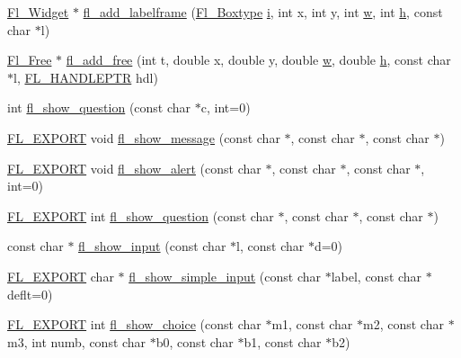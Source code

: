\begin{DoxyCompactItemize}
\item 
\hyperlink{class_fl___widget}{Fl\+\_\+\+Widget} $\ast$ \hyperlink{forms_8_h_ac556ad3943d9136f6abe849b50a025bf}{fl\+\_\+add\+\_\+labelframe} (\hyperlink{_enumerations_8_h_ae48bf9070f8541de17829f54ccacc6bc}{Fl\+\_\+\+Boxtype} \hyperlink{forms_8_h_acb559820d9ca11295b4500f179ef6392}{i}, int x, int y, int \hyperlink{forms_8_h_aac374e320caaadeca4874add33b62af2}{w}, int \hyperlink{forms_8_h_a7e427ba5b307f9068129699250690066}{h}, const char $\ast$l)
\item 
\hyperlink{class_fl___free}{Fl\+\_\+\+Free} $\ast$ \hyperlink{forms_8_h_a5805f1fbf5ae20a5b6b53d60daf5f81d}{fl\+\_\+add\+\_\+free} (int t, double x, double y, double \hyperlink{forms_8_h_aac374e320caaadeca4874add33b62af2}{w}, double \hyperlink{forms_8_h_a7e427ba5b307f9068129699250690066}{h}, const char $\ast$l, \hyperlink{_fl___free_8_h_a4bf149c6264cd35972617f05f7e3036b}{F\+L\+\_\+\+H\+A\+N\+D\+L\+E\+P\+TR} hdl)
\item 
int \hyperlink{forms_8_h_a1708944c15d2f2aec43800a40e04c008}{fl\+\_\+show\+\_\+question} (const char $\ast$c, int=0)
\item 
\hyperlink{_fl___export_8_h_aa9ba29a18aee9d738370a06eeb4470fc}{F\+L\+\_\+\+E\+X\+P\+O\+RT} void \hyperlink{forms_8_h_a4be3d378cdb6fe80150fcec2f47ed0b3}{fl\+\_\+show\+\_\+message} (const char $\ast$, const char $\ast$, const char $\ast$)
\item 
\hyperlink{_fl___export_8_h_aa9ba29a18aee9d738370a06eeb4470fc}{F\+L\+\_\+\+E\+X\+P\+O\+RT} void \hyperlink{forms_8_h_aba85bc67b4d183421b4e45a2a8a6ac2b}{fl\+\_\+show\+\_\+alert} (const char $\ast$, const char $\ast$, const char $\ast$, int=0)
\item 
\hyperlink{_fl___export_8_h_aa9ba29a18aee9d738370a06eeb4470fc}{F\+L\+\_\+\+E\+X\+P\+O\+RT} int \hyperlink{forms_8_h_aab7d9d933986379811e71fb9f9105d36}{fl\+\_\+show\+\_\+question} (const char $\ast$, const char $\ast$, const char $\ast$)
\item 
const char $\ast$ \hyperlink{forms_8_h_a0714ed98c5863c021c6bc592dd82f7e0}{fl\+\_\+show\+\_\+input} (const char $\ast$l, const char $\ast$d=0)
\item 
\hyperlink{_fl___export_8_h_aa9ba29a18aee9d738370a06eeb4470fc}{F\+L\+\_\+\+E\+X\+P\+O\+RT} char $\ast$ \hyperlink{forms_8_h_ad553f495075771b269eb3843e3ebd653}{fl\+\_\+show\+\_\+simple\+\_\+input} (const char $\ast$label, const char $\ast$deflt=0)
\item 
\hyperlink{_fl___export_8_h_aa9ba29a18aee9d738370a06eeb4470fc}{F\+L\+\_\+\+E\+X\+P\+O\+RT} int \hyperlink{forms_8_h_a8cba2fc83800f0c666050bb0d2248db0}{fl\+\_\+show\+\_\+choice} (const char $\ast$m1, const char $\ast$m2, const char $\ast$m3, int numb, const char $\ast$b0, const char $\ast$b1, const char $\ast$b2)

\end{DoxyCompactItemize}
